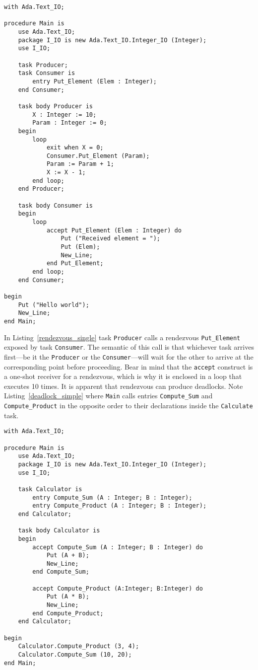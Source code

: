 \begin{minipage}{\listingwidth}
\lstset{language=ada}
\begin{lstlisting}[caption=Task rendezvous.,label=rendezvous_single]
with Ada.Text_IO;

procedure Main is
	use Ada.Text_IO;
	package I_IO is new Ada.Text_IO.Integer_IO (Integer);
	use I_IO;

	task Producer;
	task Consumer is
		entry Put_Element (Elem : Integer);
	end Consumer;

	task body Producer is
		X : Integer := 10;
		Param : Integer := 0;
	begin
		loop
			exit when X = 0;
			Consumer.Put_Element (Param);
			Param := Param + 1;
			X := X - 1;
		end loop;
	end Producer;

	task body Consumer is
	begin
		loop
			accept Put_Element (Elem : Integer) do
				Put ("Received element = ");
				Put (Elem);
				New_Line;
			end Put_Element;
		end loop;
	end Consumer;

begin
	Put ("Hello world");
	New_Line;
end Main;
\end{lstlisting}
\end{minipage}

In Listing~\ref{rendezvous_single} task \texttt{Producer} calls a
rendezvous \texttt{Put\_Element} exposed by task
\texttt{Consumer}. The semantic of this call is that whichever task
arrives first---be it the \texttt{Producer} or the
\texttt{Consumer}---will wait for the other to arrive at the
corresponding point before proceeding. Bear in mind that the
\texttt{accept} construct is a one-shot receiver for a rendezvous,
which is why it is enclosed in a loop that executes 10 times. It is
apparent that rendezvous can produce deadlocks. Note
Listing~\ref{deadlock_simple} where \texttt{Main} calls entries
\texttt{Compute\_Sum} and \texttt{Compute\_Product} in the opposite
order to their declarations inside the \texttt{Calculate} task.

\begin{minipage}{\listingwidth}
\lstset{language=ada}
\begin{lstlisting}[caption=Deadlock in rendezvous caused by
    call/accept order inversion.,label=deadlock_simple]
with Ada.Text_IO;

procedure Main is
	use Ada.Text_IO;
	package I_IO is new Ada.Text_IO.Integer_IO (Integer);
	use I_IO;

	task Calculator is
		entry Compute_Sum (A : Integer; B : Integer);
		entry Compute_Product (A : Integer; B : Integer);
	end Calculator;

	task body Calculator is
	begin
		accept Compute_Sum (A : Integer; B : Integer) do
			Put (A + B);
			New_Line;
		end Compute_Sum;

		accept Compute_Product (A:Integer; B:Integer) do
			Put (A * B);
			New_Line;
		end Compute_Product;
	end Calculator;

begin
	Calculator.Compute_Product (3, 4);
	Calculator.Compute_Sum (10, 20);
end Main;
\end{lstlisting}
\end{minipage}

